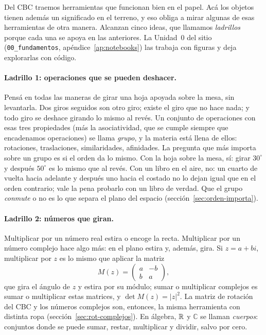 Del CBC traemos herramientas que funcionan bien en el papel. Acá los objetos tienen además un
significado en el terreno, y eso obliga a mirar algunas de esas herramientas de otra manera.
Alcanzan cinco ideas, que llamamos \emph{ladrillos} porque cada una se apoya en las anteriores.
La Unidad~0 del sitio (\texttt{00\_fundamentos}, apéndice~\ref{ap:notebooks}) las trabaja con
figuras y deja explorarlas con código.

\paragraph{Ladrillo 1: operaciones que se pueden deshacer.}
Pensá en todas las maneras de girar una hoja apoyada sobre la mesa, sin levantarla. Dos giros
seguidos son otro giro; existe el giro que no hace nada; y todo giro se deshace girando lo mismo
al revés. Un conjunto de operaciones con esas tres propiedades (más la asociatividad, que se
cumple siempre que encadenamos operaciones) se llama \emph{grupo}, y la materia está llena de
ellos: rotaciones, traslaciones, similaridades, afinidades. La pregunta que más importa sobre un
grupo es si el orden da lo mismo. Con la hoja sobre la mesa, sí: girar \(30^\circ\) y después
\(50^\circ\) es lo mismo que al revés. Con un libro en el aire, no: un cuarto de vuelta hacia
adelante y después uno hacia el costado no lo dejan igual que en el orden contrario; vale la
pena probarlo con un libro de verdad. Que el grupo \emph{conmute} o no es lo que separa el plano
del espacio (sección~\ref{sec:orden-importa}).

\paragraph{Ladrillo 2: números que giran.}
Multiplicar por un número real estira o encoge la recta. Multiplicar por un número complejo
hace algo más: en el plano estira y, además, gira. Si \(z=a+bi\), multiplicar por \(z\) es lo
mismo que aplicar la matriz
\[
  M(z)=\begin{pmatrix}a&-b\\ b&a\end{pmatrix},
\]
que gira el ángulo de \(z\) y estira por su módulo; sumar o multiplicar complejos es sumar o
multiplicar estas matrices, y \(\det M(z)=|z|^2\). La matriz de rotación del CBC y los números
complejos son, entonces, la misma herramienta con distinta ropa
(sección~\ref{sec:rot-complejos}). En álgebra, \(\mathbb{R}\) y \(\mathbb{C}\) se llaman
\emph{cuerpos}: conjuntos donde se puede sumar, restar, multiplicar y dividir, salvo por cero.

